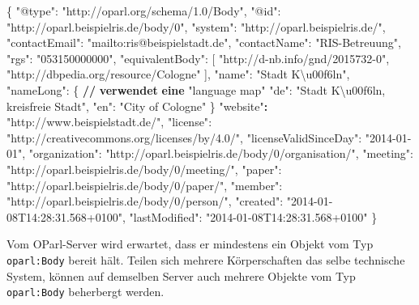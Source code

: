 \documentclass[,a4paper]{article}
\newenvironment{Shaded}{}{}
\newcommand{\DataTypeTok}[1]{\textcolor[rgb]{0.56,0.13,0.00}{{#1}}}
\newcommand{\StringTok}[1]{\textcolor[rgb]{0.25,0.44,0.63}{{#1}}}
\newcommand{\ErrorTok}[1]{\textcolor[rgb]{1.00,0.00,0.00}{\textbf{{#1}}}}
\newcommand{\NormalTok}[1]{{#1}}
\begin{document}
\begin{Shaded}
\begin{Highlighting}[]
\NormalTok{\{}
    \DataTypeTok{"@type"}\NormalTok{: }\StringTok{"http://oparl.org/schema/1.0/Body"}\NormalTok{,}
    \DataTypeTok{"@id"}\NormalTok{: }\StringTok{"http://oparl.beispielris.de/body/0"}\NormalTok{,}
    \DataTypeTok{"system"}\NormalTok{: }\StringTok{"http://oparl.beispielris.de/"}\NormalTok{,}
    \DataTypeTok{"contactEmail"}\NormalTok{: }\StringTok{"mailto:ris@beispielstadt.de"}\NormalTok{,}
    \DataTypeTok{"contactName"}\NormalTok{: }\StringTok{"RIS-Betreuung"}\NormalTok{,}
    \DataTypeTok{"rgs"}\NormalTok{: }\StringTok{"053150000000"}\NormalTok{,}
    \DataTypeTok{"equivalentBody"}\NormalTok{: [}
        \StringTok{"http://d-nb.info/gnd/2015732-0"}\NormalTok{,}
        \StringTok{"http://dbpedia.org/resource/Cologne"}
    \NormalTok{],}
    \DataTypeTok{"name"}\NormalTok{: }\StringTok{"Stadt K\textbackslash{}u00f6ln"}\NormalTok{,}
    \DataTypeTok{"nameLong"}\NormalTok{: \{ }\ErrorTok{//} \ErrorTok{verwendet} \ErrorTok{eine} \DataTypeTok{"language map"}
        \DataTypeTok{"de"}\NormalTok{: }\StringTok{"Stadt K\textbackslash{}u00f6ln, kreisfreie Stadt"}\NormalTok{,}
        \DataTypeTok{"en"}\NormalTok{: }\StringTok{"City of Cologne"}
    \NormalTok{\}}
    \StringTok{"website"}\ErrorTok{:} \StringTok{"http://www.beispielstadt.de/"}\NormalTok{,}
    \DataTypeTok{"license"}\NormalTok{: }\StringTok{"http://creativecommons.org/licenses/by/4.0/"}\NormalTok{,}
    \DataTypeTok{"licenseValidSinceDay"}\NormalTok{: }\StringTok{"2014-01-01"}\NormalTok{,}
    \DataTypeTok{"organization"}\NormalTok{: }\StringTok{"http://oparl.beispielris.de/body/0/organisation/"}\NormalTok{,}
    \DataTypeTok{"meeting"}\NormalTok{: }\StringTok{"http://oparl.beispielris.de/body/0/meeting/"}\NormalTok{,}
    \DataTypeTok{"paper"}\NormalTok{: }\StringTok{"http://oparl.beispielris.de/body/0/paper/"}\NormalTok{,}
    \DataTypeTok{"member"}\NormalTok{: }\StringTok{"http://oparl.beispielris.de/body/0/person/"}\NormalTok{,}
    \DataTypeTok{"created"}\NormalTok{: }\StringTok{"2014-01-08T14:28:31.568+0100"}\NormalTok{,}
    \DataTypeTok{"lastModified"}\NormalTok{: }\StringTok{"2014-01-08T14:28:31.568+0100"}
\NormalTok{\}}
\end{Highlighting}
\end{Shaded}

Vom OParl-Server wird erwartet, dass er mindestens ein Objekt vom Typ
\texttt{oparl:Body} bereit hält. Teilen sich mehrere Körperschaften das
selbe technische System, können auf demselben Server auch mehrere
Objekte vom Typ \texttt{oparl:Body} beherbergt werden.
\end{document}
